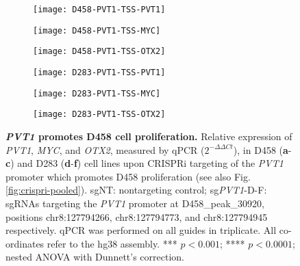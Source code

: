 \begin{figure}[!h]
    \centering
    \begin{subfigure}{.32\textwidth}
        \centering
        \texttt{[image: D458-PVT1-TSS-PVT1]}
        \caption{}
        \label{subfig:d458-pvt1-tss-pvt1}
    \end{subfigure}
    \begin{subfigure}{.32\textwidth}
        \centering
        \texttt{[image: D458-PVT1-TSS-MYC]}
        \caption{}
        \label{subfig:d458-pvt1-tss-myc}
    \end{subfigure}
    \begin{subfigure}{.32\textwidth}
        \centering
        \texttt{[image: D458-PVT1-TSS-OTX2]}
        \caption{}
        \label{subfig:d458-pvt1-tss-otx2}
    \end{subfigure}
    \begin{subfigure}{.32\textwidth}
        \centering
        \texttt{[image: D283-PVT1-TSS-PVT1]}
        \caption{}
        \label{subfig:d283-pvt1-tss-pvt1}
    \end{subfigure}
    \begin{subfigure}{.32\textwidth}
        \centering
        \texttt{[image: D283-PVT1-TSS-MYC]}
        \caption{}
        \label{subfig:d283-pvt1-tss-myc}
    \end{subfigure}
    \begin{subfigure}{.32\textwidth}
        \centering
        \texttt{[image: D283-PVT1-TSS-OTX2]}
        \caption{}
        \label{subfig:d283-pvt1-tss-otx2}
    \end{subfigure}
    \caption[\textit{PVT1} promotes D458 cell proliferation.]{\textbf{\textit{PVT1} promotes D458 cell proliferation.} 
     Relative expression of \textit{PVT1}, \textit{MYC}, and \textit{OTX2}, measured by qPCR ($2^{-\Delta\Delta Ct}$), in D458 (\textbf{a}-\textbf{c}) and D283 (\textbf{d}-\textbf{f}) cell lines upon CRISPRi targeting of the \textit{PVT1} promoter which promotes D458 proliferation (see also Fig. \ref{fig:crispri-pooled}). sgNT: nontargeting control; sg\textit{PVT1}-D-F: sgRNAs targeting the \textit{PVT1} promoter at D458\_peak\_30920, positions chr8:127794266, chr8:127794773, and chr8:127794945 respectively. qPCR was performed on all guides in triplicate. All co-ordinates refer to the hg38 assembly. *** $p < 0.001$; **** $p < 0.0001$; nested ANOVA with Dunnett’s correction.
    }
    \label{fig:crispri-pvt1-tss}
\end{figure}

